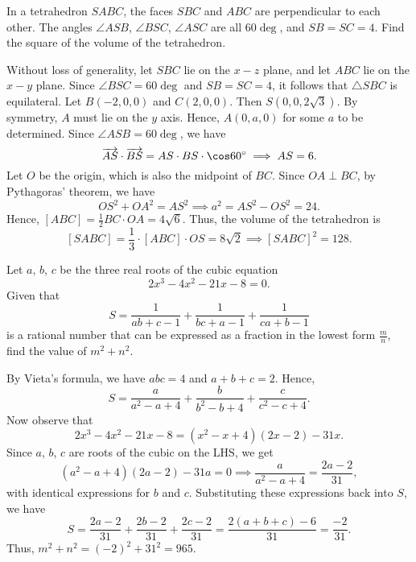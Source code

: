 \begin{question}[128]\label{Q::2024-S-1-13}
    In a tetrahedron $SABC$, the faces $SBC$ and $ABC$ are perpendicular to each other. The angles $\angle ASB$, $\angle BSC$, $\angle ASC$ are all $60\deg$, and $SB = SC = 4$. Find the square of the volume of the tetrahedron.

    \begin{center}
    \end{center}
\end{question}
\begin{solution*}
    Without loss of generality, let $SBC$ lie on the $x-z$ plane, and let $ABC$ lie on the $x-y$ plane. Since $\angle BSC = 60\deg$ and $SB = SC = 4$, it follows that $\triangle SBC$ is equilateral. Let $B(-2, 0, 0)$ and $C(2, 0, 0)$. Then $S(0, 0, 2\sqrt3)$. By symmetry, $A$ must lie on the $y$ axis. Hence, $A(0, a, 0)$ for some $a$ to be determined. Since $\angle ASB = 60\deg$, we have \[\oa{AS} \dotp \oa{BS} = AS \cdot BS \cdot \cos 60\deg \implies AS = 6.\] Let $O$ be the origin, which is also the midpoint of $BC$. Since $OA \perp BC$, by Pythagoras' theorem, we have \[OS^2 + OA^2 = AS^2 \implies a^2 = AS^2 - OS^2 = 24.\] Hence, $[ABC] = \frac12 BC \cdot OA = 4\sqrt6$. Thus, the volume of the tetrahedron is \[[SABC] = \frac13 \cdot [ABC] \cdot OS = 8\sqrt{2} \implies [SABC]^2 = 128.\]
\end{solution*}

\begin{question}[965]\label{Q::2024-S-1-14}
    Let $a$, $b$, $c$ be the three real roots of the cubic equation \[2x^3 - 4x^2 - 21x - 8 = 0.\] Given that \[S = \frac1{ab + c -1} + \frac1{bc + a -1} + \frac1{ca + b - 1}\] is a rational number that can be expressed as a fraction in the lowest form $\frac{m}{n}$, find the value of $m^2 + n^2$.
\end{question}
\begin{solution*}
    By Vieta's formula, we have $abc = 4$ and $a + b + c = 2$. Hence, \[S = \frac{a}{a^2 - a + 4} + \frac{b}{b^2 - b + 4} + \frac{c}{c^2 - c + 4}.\] Now observe that \[2x^3 - 4x^2 - 21x - 8 = (x^2 - x + 4)(2x - 2) - 31 x.\] Since $a$, $b$, $c$ are roots of the cubic on the LHS, we get \[(a^2 - a + 4)(2a - 2) - 31a = 0 \implies \frac{a}{a^2 - a + 4} = \frac{2a - 2}{31},\] with identical expressions for $b$ and $c$. Substituting these expressions back into $S$, we have \[S = \frac{2a - 2}{31} + \frac{2b - 2}{31} + \frac{2c - 2}{31} = \frac{2(a+b+c) - 6}{31} = \frac{-2}{31}.\] Thus, $m^2 + n^2 = (-2)^2 + 31^2 = 965$.
\end{solution*}

